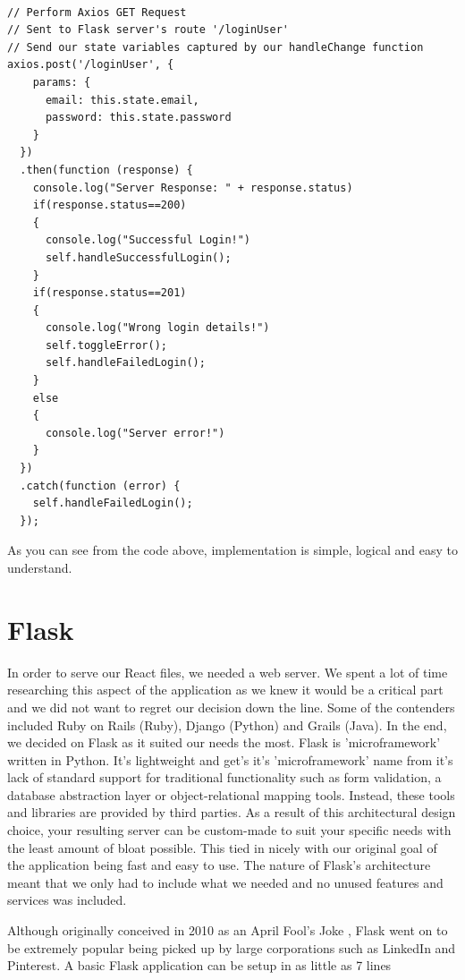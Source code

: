 \begin{verbatim}

// Perform Axios GET Request
// Sent to Flask server's route '/loginUser'
// Send our state variables captured by our handleChange function 
axios.post('/loginUser', {
    params: {
      email: this.state.email,
      password: this.state.password
    }
  })
  .then(function (response) {
    console.log("Server Response: " + response.status)
    if(response.status==200)
    {
      console.log("Successful Login!")
      self.handleSuccessfulLogin();
    }
    if(response.status==201)
    {
      console.log("Wrong login details!")
      self.toggleError();
      self.handleFailedLogin();
    }
    else
    {
      console.log("Server error!")
    }
  })
  .catch(function (error) {
    self.handleFailedLogin();
  });  
\end{verbatim}

As you can see from the code above, implementation is simple, logical and easy to understand.


\newpage\section{Flask}
In order to serve our React files, we needed a web server. We spent a lot of time researching this aspect of the application as we knew it would be a critical part and we did not want to regret our decision down the line. Some of the contenders included Ruby on Rails (Ruby), Django (Python) and 
Grails (Java). In the end, we decided on Flask as it suited our needs the most. Flask is 'microframework' written in Python. It's lightweight and get's it's 'microframework' name from it's lack of standard support for traditional functionality such as form validation, a database abstraction layer or object-relational mapping tools. Instead, these tools and libraries are provided by third parties. 
As a result of this architectural design choice, your resulting server can be custom-made to suit your specific needs with the least amount of bloat possible. This tied in nicely with our original goal of the application being fast and easy to use. The nature of Flask's architecture meant that we only had to include what we needed and no unused features and services was included.

Although originally conceived in 2010 as an April Fool's Joke \cite{FlaskOrigins}, Flask went on to be extremely popular being picked up by large corporations such as LinkedIn and Pinterest. A basic Flask application can be setup in as little as 7 lines 

